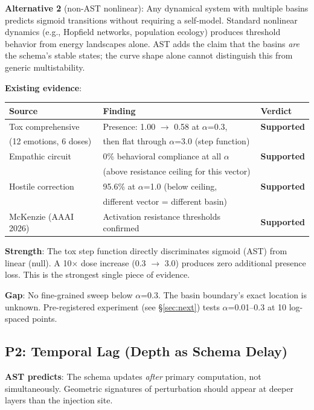 \documentclass[11pt,letterpaper]{article}
\begin{document}
\textbf{Alternative 2} (non-AST nonlinear): Any dynamical system with
multiple basins predicts sigmoid transitions without requiring a
self-model. Standard nonlinear dynamics (e.g., Hopfield networks,
population ecology) produces threshold behavior from energy
landscapes alone. AST adds the claim that the basins \emph{are}
the schema's stable states; the curve shape alone cannot distinguish
this from generic multistability.

\textbf{Existing evidence}:

\begin{table}[H]
\centering
\begin{tabular}{lll}
\toprule
Source & Finding & Verdict \\
\midrule
Tox comprehensive & Presence: 1.00 $\to$ 0.58 at $\alpha$=0.3, &
  \textbf{Supported} \\
(12 emotions, 6 doses) & then flat through $\alpha$=3.0 (step function) & \\
Empathic circuit & 0\% behavioral compliance at all $\alpha$ &
  \textbf{Supported} \\
 & (above resistance ceiling for this vector) & \\
Hostile correction & 95.6\% at $\alpha$=1.0 (below ceiling, &
  \textbf{Supported} \\
 & different vector = different basin) & \\
McKenzie (AAAI 2026) & Activation resistance thresholds confirmed &
  \textbf{Supported} \\
\bottomrule
\end{tabular}
\end{table}

\textbf{Strength}: The tox step function directly discriminates
sigmoid (AST) from linear (null). A 10$\times$ dose increase
(0.3 $\to$ 3.0) produces zero additional presence loss. This is the
strongest single piece of evidence.

\textbf{Gap}: No fine-grained sweep below $\alpha$=0.3. The basin
boundary's exact location is unknown. Pre-registered experiment
(see \S\ref{sec:next}) tests $\alpha$=0.01--0.3 at 10 log-spaced
points.

\subsection{P2: Temporal Lag (Depth as Schema Delay)}

\textbf{AST predicts}: The schema updates \emph{after} primary
computation, not simultaneously. Geometric signatures of perturbation
should appear at deeper layers than the injection site.
\end{document}
